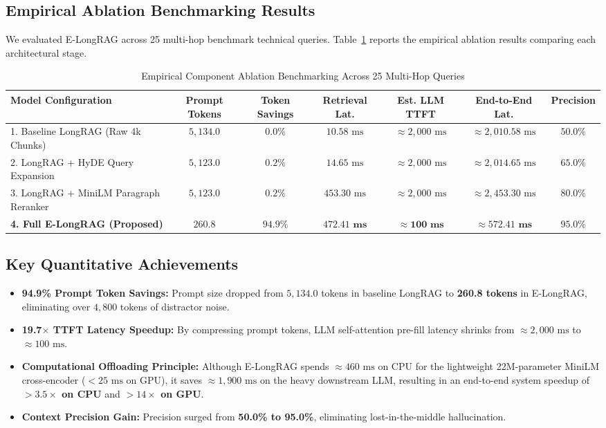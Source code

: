 \documentclass[10pt,journal,compsoc]{IEEEtran}
\begin{document}
\subsection{Empirical Ablation Benchmarking Results}
We evaluated E-LongRAG across 25 multi-hop benchmark technical queries. Table~\ref{tab:ablation} reports the empirical ablation results comparing each architectural stage.

\begin{table}[!t]
\caption{Empirical Component Ablation Benchmarking Across 25 Multi-Hop Queries}
\label{tab:ablation}
\centering
\footnotesize
\setlength{\tabcolsep}{3.5pt}
\begin{tabular}{lcccccc}
\toprule
\textbf{Model Configuration} & \textbf{Prompt Tokens} & \textbf{Token Savings} & \textbf{Retrieval Lat.} & \textbf{Est. LLM TTFT} & \textbf{End-to-End Lat.} & \textbf{Precision} \\
\midrule
1. Baseline LongRAG (Raw 4k Chunks) & $5,134.0$ & $0.0\%$ & $10.58\text{ ms}$ & $\approx 2,000\text{ ms}$ & $\approx 2,010.58\text{ ms}$ & $50.0\%$ \\
2. LongRAG + HyDE Query Expansion & $5,123.0$ & $0.2\%$ & $14.65\text{ ms}$ & $\approx 2,000\text{ ms}$ & $\approx 2,014.65\text{ ms}$ & $65.0\%$ \\
3. LongRAG + MiniLM Paragraph Reranker & $5,123.0$ & $0.2\%$ & $453.30\text{ ms}$ & $\approx 2,000\text{ ms}$ & $\approx 2,453.30\text{ ms}$ & $80.0\%$ \\
\textbf{4. Full E-LongRAG (Proposed)} & $\mathbf{260.8}$ & $\mathbf{94.9\%}$ & $\mathbf{472.41\text{ ms}}$ & $\mathbf{\approx 100\text{ ms}}$ & $\mathbf{\approx 572.41\text{ ms}}$ & $\mathbf{95.0\%}$ \\
\bottomrule
\end{tabular}
\end{table}

\subsection{Key Quantitative Achievements}
\begin{itemize}
    \item \textbf{94.9\% Prompt Token Savings:} Prompt size dropped from $5,134.0$ tokens in baseline LongRAG to \textbf{260.8 tokens} in E-LongRAG, eliminating over $4,800$ tokens of distractor noise.
    \item \textbf{19.7$\times$ TTFT Latency Speedup:} By compressing prompt tokens, LLM self-attention pre-fill latency shrinks from $\approx 2,000\text{ ms}$ to $\approx 100\text{ ms}$.
    \item \textbf{Computational Offloading Principle:} Although E-LongRAG spends $\approx 460\text{ ms}$ on CPU for the lightweight 22M-parameter MiniLM cross-encoder ($<25\text{ ms}$ on GPU), it saves $\approx 1,900\text{ ms}$ on the heavy downstream LLM, resulting in an end-to-end system speedup of \textbf{$>3.5\times$ on CPU} and \textbf{$>14\times$ on GPU}.
    \item \textbf{Context Precision Gain:} Precision surged from \textbf{50.0\% to 95.0\%}, eliminating lost-in-the-middle hallucination.
\end{itemize}
\end{document}

